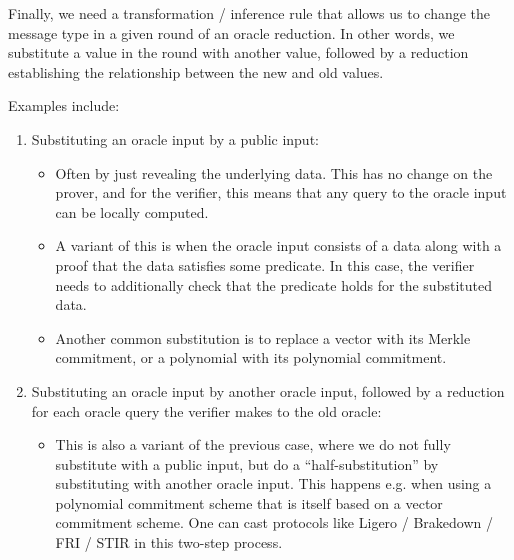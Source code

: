 Finally, we need a transformation / inference rule that allows us to change the message type in a given round of an oracle reduction. In other words, we substitute a value in the round with another value, followed by a reduction establishing the relationship between the new and old values.


Examples include:
\begin{enumerate}
    \item Substituting an oracle input by a public input:
    \begin{itemize}
        \item Often by just revealing the underlying data. This has no change on the prover, and for
        the verifier, this means that any query to the oracle input can be locally computed.
        \item A variant of this is when the oracle input consists of a data along with a proof that
        the data satisfies some predicate. In this case, the verifier needs to additionally check
        that the predicate holds for the substituted data.
        \item Another common substitution is to replace a vector with its Merkle commitment, or a
        polynomial with its polynomial commitment.
    \end{itemize}
    \item Substituting an oracle input by another oracle input, followed by a reduction for each
    oracle query the verifier makes to the old oracle:
    \begin{itemize}
        \item This is also a variant of the previous case, where we do not fully substitute with a
        public input, but do a ``half-substitution'' by substituting with another oracle input. This
        happens e.g. when using a polynomial commitment scheme that is itself based on a vector
        commitment scheme. One can cast protocols like Ligero / Brakedown / FRI / STIR in this
        two-step process.
    \end{itemize}
\end{enumerate}